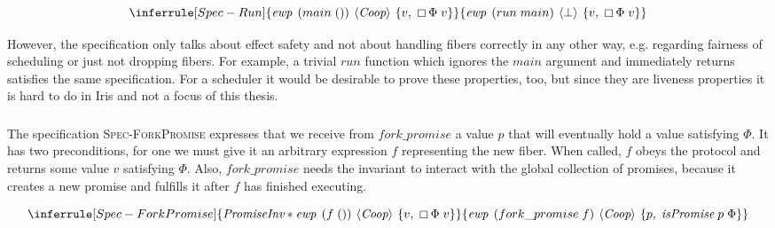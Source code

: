 \[
  \inferrule[Spec-Run]
  {\ewp{main\; ()}{\proto{}}{v,\; \always \Phi\; v}}
  {\ewp{run\; main}{\bot}{v,\; \always \Phi\; v}}
\]


However, the specification only talks about effect safety and not about handling fibers correctly in any other way, e.g. regarding fairness of scheduling or just not dropping fibers.
For example, a trivial \(run\) function which ignores the \(main\) argument and immediately returns satisfies the same specification.
For a scheduler it would be desirable to prove these properties, too, but since they are liveness properties it is hard to do in Iris and not a focus of this thesis.

\subsubsection{}
\label{sec:sched-spec-fork}

The specification \textsc{Spec-ForkPromise} expresses that we receive from \(fork\_promise\) a value \(p\) that will eventually hold a value satisfying \(\Phi\).
It has two preconditions, for one we must give it an arbitrary expression \(f\) representing the new fiber.
When called, \(f\) obeys the \proto{} protocol and returns some value \(v\) satisfying \(\Phi\).
Also, \(fork\_promise\) needs the \gsPInv{} invariant to interact with the global collection of promises, because it creates a new promise and fulfills it after \(f\) has finished executing.

\[
  \inferrule[Spec-ForkPromise]
  {\gsPInv{} \ast \ewp{f\;()}{\proto{}}{v,\; \always \Phi\; v}}
  {\ewp{fork\_promise\; f}{\proto{}}{p,\; \gsIsPr{}\; p\; \Phi}}
\]

